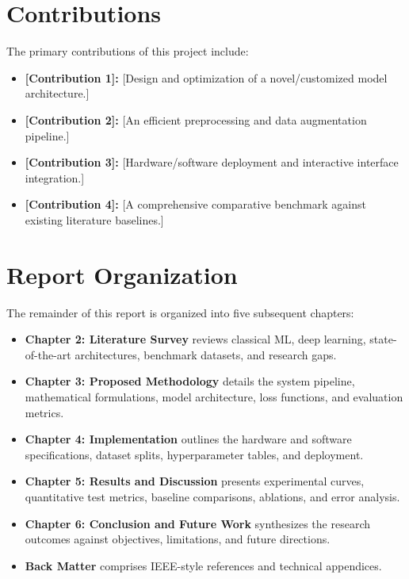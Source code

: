 \section{Contributions}
The primary contributions of this project include:
\begin{itemize}
    \item \textbf{[Contribution 1]:} [Design and optimization of a novel/customized model architecture.]
    \item \textbf{[Contribution 2]:} [An efficient preprocessing and data augmentation pipeline.]
    \item \textbf{[Contribution 3]:} [Hardware/software deployment and interactive interface integration.]
    \item \textbf{[Contribution 4]:} [A comprehensive comparative benchmark against existing literature baselines.]
\end{itemize}

\section{Report Organization}
The remainder of this report is organized into five subsequent chapters:
\begin{itemize}\itemsep=1pt \topsep=1pt
    \item \textbf{Chapter 2: Literature Survey} reviews classical ML, deep learning, state-of-the-art architectures, benchmark datasets, and research gaps.
    \item \textbf{Chapter 3: Proposed Methodology} details the system pipeline, mathematical formulations, model architecture, loss functions, and evaluation metrics.
    \item \textbf{Chapter 4: Implementation} outlines the hardware and software specifications, dataset splits, hyperparameter tables, and deployment.
    \item \textbf{Chapter 5: Results and Discussion} presents experimental curves, quantitative test metrics, baseline comparisons, ablations, and error analysis.
    \item \textbf{Chapter 6: Conclusion and Future Work} synthesizes the research outcomes against objectives, limitations, and future directions.
    \item \textbf{Back Matter} comprises IEEE-style references and technical appendices.
\end{itemize}
